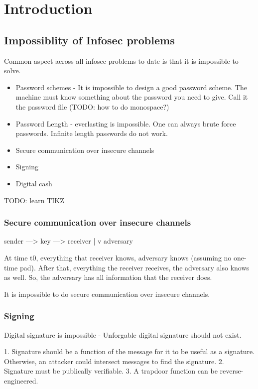 \section{Introduction}

\subsection{Impossiblity of Infosec problems}
Common aspect across all infosec problems to date is that it is
impossible to solve.
\begin{itemize}
    \item Password schemes - It is impossible to design a good password scheme.
          The machine must know something about the password you need to give.
          Call it the password file (TODO: how to do monospace?)
    \item Password Length - everlasting is impossible. One can always brute
        force passwords. Infinite length passwords do not work.
    \item  Secure communication over insecure channels
    \item Signing
    \item  Digital cash
\end{itemize}

TODO: learn TIKZ


\subsubsection{Secure communication over insecure channels}
\begin{listing}
sender ---> key ---> receiver
            |
            v
            adversary
\end{listing}

At time t0, everything that receiver knows, adversary knows (assuming no
one-time pad). After that, everything the receiver receives, the adversary
also knows as well. So, the adversary has all information that the receiver
does.

It is impossible to do secure communication over insecure channels.

\subsubsection{Signing}
Digital signature is impossible - Unforgable digital signature should not exist.


1. Signature should be a function of the message for it to be useful as a signature.
   Otherwise, an attacker could intersect messages to find the signature.
2. Signature must be publically verifiable.
3. A trapdoor function can be reverse-engineered.

